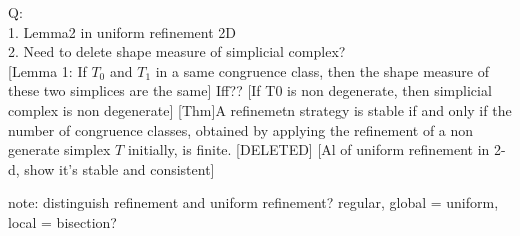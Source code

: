 \documentclass{article}
\begin{document}
    Q:\\
    1. Lemma2 in uniform refinement 2D\\
    2. Need to delete shape measure of simplicial complex?\\
   

    [Lemma 1: If $T_0$ and $T_1$ in a same congruence class, then the shape measure of these two simplices are the same] Iff??
    [If T0 is non degenerate, then simplicial complex is non degenerate]
    [Thm]A refinemetn strategy is stable if and only if the number of congruence classes, obtained by applying the refinement of a non generate simplex $T$ initially, is finite. [DELETED]
    [Al of uniform refinement in 2-d, show it's stable and consistent]

    note: distinguish refinement and uniform refinement? regular, global = uniform, local = bisection?



\end{document}
